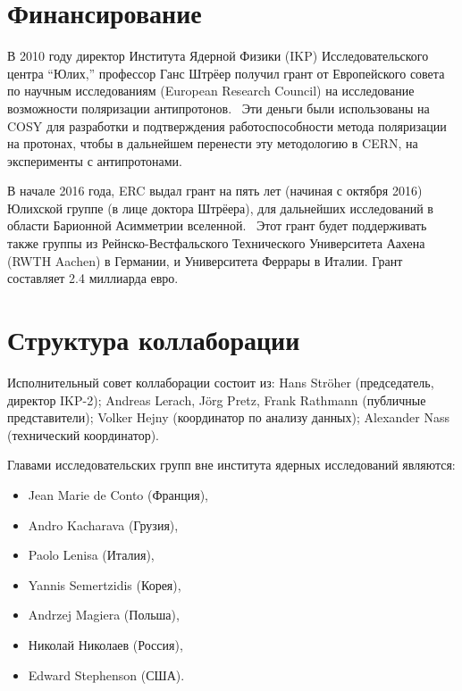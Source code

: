 \documentclass{extarticle}
\begin{document}
\section{Финансирование}
В 2010 году директор Института Ядерной Физики (IKP) Исследовательского центра ``Юлих,'' профессор Ганс Штрёер получил грант от Европейского совета по научным исследованиям (European Research Council) на исследование возможности поляризации антипротонов.~\cite{ERCGrant10} Эти деньги были использованы на COSY для разработки и подтверждения работоспособности метода поляризации на протонах, чтобы в дальнейшем перенести эту методологию в CERN, на эксперименты с антипротонами.

В начале 2016 года, ERC выдал грант на пять лет (начиная с октября 2016) Юлихской группе (в лице доктора Штрёера), для дальнейших исследований в области Барионной Асимметрии вселенной.~\cite{ERCGrant16} Этот грант будет поддерживать также группы из Рейнско-Вестфальского Технического Университета Аахена (RWTH Aachen) в Германии, и Университета Феррары в Италии. Грант составляет 2.4 миллиарда евро.

\section{Структура коллаборации~\cite{ERCGrant12}}


Исполнительный совет коллаборации состоит из: Hans Str\"oher (председатель, директор IKP-2); Andreas Lerach, J\"org Pretz, Frank Rathmann (публичные представители); Volker Hejny (координатор по анализу данных); Alexander Nass (технический координатор). 

Главами исследовательских групп вне института ядерных исследований являются:
\begin{itemize}
	\item Jean Marie de Conto (Франция),
	\item Andro Kacharava (Грузия),
	\item Paolo Lenisa (Италия),
	\item Yannis Semertzidis (Корея),
	\item Andrzej Magiera (Польша),
	\item Николай Николаев (Россия),
	\item Edward Stephenson (США).
\end{itemize}
\end{document}
